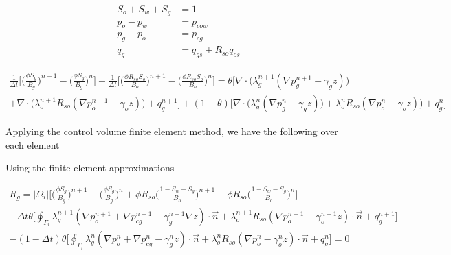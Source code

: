 \documentclass[12pt]{article}
\begin{document}
\begin{equation}
\begin{split}
S_o+S_w+S_g&=1 \\
p_o-p_w  &= p_{cow}		\\
p_g-p_o  &= p_{cg}		\\
q_g &= q_{gs}+R_{so}q_{os}
\end{split}
\end{equation}

\begin{multline}	\label{g1}
\frac{1}{\Delta t}\Big[\Big(\frac{\phi S_g}{B_g}\Big)^{n+1}-\Big(\frac{\phi S_g}{B_g}\Big)^n\Big] + \frac{1}{\Delta t}\Big[\Big(\frac{\phi R_{so}S_o}{B_o}\Big)^{n+1}-\Big(\frac{\phi R_{so}S_o}{B_o}\Big)^n\Big]  = \theta\Big[ \nabla\cdot\Big(\lambda^{n+1}_g(\nabla p^{n+1}_g-\gamma_gz)\Big)	\\
+\nabla\cdot\Big(\lambda^{n+1}_oR_{so}(\nabla p^{n+1}_o-\gamma_oz)\Big)+q^{n+1}_{g}\Big]	
+(1-\theta)\Big[\nabla\cdot\Big(\lambda^{n}_g(\nabla p^{n}_g-\gamma_gz)\Big)+\lambda^{n}_oR_{so}(\nabla p^{n}_o-\gamma_oz)\Big)+q^{n}_{g}\Big]
\end{multline}

Applying the control volume finite element method, we have the following over each element


Using the  finite element approximations

\begin{multline}	\label{g2a}
R_g = |\Omega_i|\Big[\Big(\frac{\phi S_g}{B_g}\Big)^{n+1}-\Big(\frac{\phi S_g}{B_g}\Big)^n + \phi R_{so}\Big(\frac{1-S_w-S_g}{B_o}\Big)^{n+1}- \phi R_{so}\Big(\frac{1-S_w-S_g}{B_o}\Big)^{n}\Big] \\
- \Delta t\theta\Big[\oint_{\Gamma_i}\lambda^{n+1}_g(\nabla p^{n+1}_o+\nabla p^{n+1}_{cg}-\gamma^{n+1}_g\nabla z)\cdot\vec{n} + \lambda^{n+1}_oR_{so}(\nabla p^{n+1}_o-\gamma^{n+1}_oz)\cdot\vec{n}+ q^{n+1}_{g}\Big]  \\
- (1-\Delta t)\theta\Big[\oint_{\Gamma_i}\lambda^{n}_g(\nabla p^{n}_o+\nabla p^{n}_{cg}-\gamma^{n}_gz)\cdot\vec{n} + \lambda^{n}_oR_{so}(\nabla p^{n}_o-\gamma^{n}_oz)\cdot\vec{n}+ q^{n}_{g}\Big]  =0
\end{multline}
\end{document}

